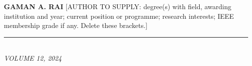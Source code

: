 \documentclass[10pt,twocolumn]{article}
\begin{document}
{\vspace{8pt}
\noindent\begin{minipage}[t]{1.0in}\vspace{0pt}%
\end{minipage}\hfill
\begin{minipage}[t]{\dimexpr\columnwidth-1.1in\relax}\vspace{0pt}%
\textbf{GAMAN A. RAI} [AUTHOR TO SUPPLY: degree(s) with field, awarding institution and year; current position or programme; research interests; IEEE membership grade if any. Delete these brackets.]
\end{minipage}

\vspace{6pt}
\noindent\rule{\columnwidth}{0.4pt}\\
{\fontsize{7}{8.5}\selectfont\itshape VOLUME 12, 2024\hfill}
}
\end{document}
